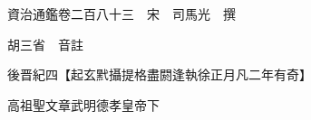 










 


 
 


 

  
  
  
  
  





  
  
  
  
  
 
  

  

  
  
  



  

 
 

  
   




  

  
  


  　　資治通鑑卷二百八十三　宋　司馬光　撰

　　胡三省　音註

　　後晋紀四【起玄黓攝提格盡閼逢執徐正月凡二年有奇】

　　高祖聖文章武明德孝皇帝下

